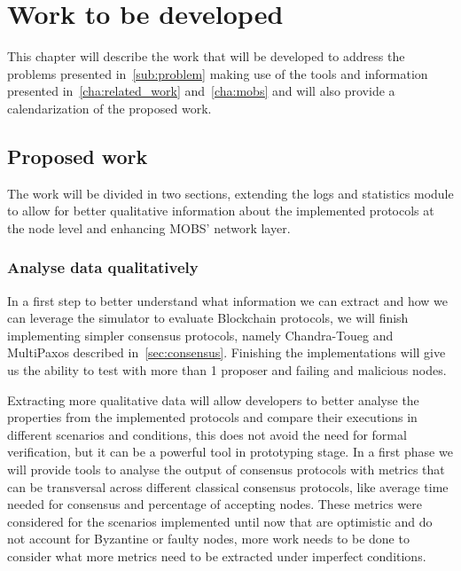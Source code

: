 
%

\chapter{Work to be developed}\label{cha:work_to_be_developed}

This chapter will describe the work that will be developed to address the
problems presented in~\ref{sub:problem} making use of the tools and information
presented in~\ref{cha:related_work} and~\ref{cha:mobs} and will also provide
a calendarization of the proposed work.

\section{Proposed work}\label{sub:sub_proposed_work}

The work will be divided in two sections, extending the logs and statistics 
module to allow for better qualitative
information about the implemented protocols at the node level and enhancing MOBS' network layer.

\subsection{Analyse data qualitatively}\label{subsec:improve_qualitative_data}

In a first step to better understand what information we can extract and how
we can leverage the simulator to evaluate Blockchain protocols, we will finish implementing
simpler consensus protocols, namely Chandra-Toueg and MultiPaxos described in~\ref{sec:consensus}.
Finishing the implementations will give us the ability to test with more than 1 proposer and
failing and malicious nodes.

Extracting more qualitative data will allow developers to better analyse the properties
from the implemented protocols and compare their executions in different scenarios and conditions,
this does not avoid the need for formal verification, but it can be a powerful tool in prototyping stage.
In a first phase we will provide tools to analyse the output of consensus protocols
with metrics that can be transversal across different classical consensus protocols, like
average time needed for consensus and percentage of accepting nodes. These metrics were considered
for the scenarios implemented until now that are optimistic and do not account for Byzantine or
faulty nodes, more work needs to be done to consider what more metrics need to be extracted under
imperfect conditions.

